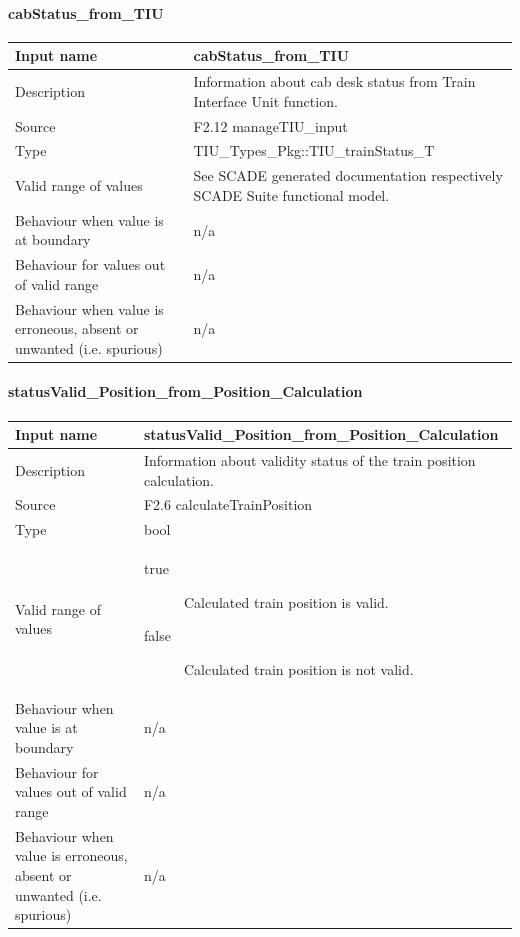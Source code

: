 \paragraph{cabStatus\_from\_TIU}

\begin{longtable}{p{}p{}}
\toprule
Input name				& cabStatus\_from\_TIU  \\
\midrule
Description				& Information about cab desk status from Train Interface Unit function. \\
\midrule
Source					& F2.12 manageTIU\_input\\ 
\midrule
Type					& TIU\_Types\_Pkg::TIU\_trainStatus\_T \\
\midrule
Valid range of values	& See SCADE generated documentation respectively SCADE Suite functional model. \\
\midrule
Behaviour when value is at boundary	& n/a \\
\midrule
Behaviour for values out of valid range	& n/a \\
\midrule
Behaviour when value is erroneous, absent or unwanted (i.e. spurious) & n/a \\
\bottomrule
\end{longtable}

\paragraph{statusValid\_Position\_from\_Position\_Calculation}

\begin{longtable}{p{}p{}}
\toprule
Input name				& statusValid\_Position\_from\_Position\_Calculation  \\
\midrule
Description				& Information about validity status of the train position calculation. \\
\midrule
Source					& F2.6 calculateTrainPosition\\ 
\midrule
Type					& bool \\
\midrule
Valid range of values	& \begin{description}
\item[true]Calculated train position is valid.
\item[false]Calculated train position is not valid.
\end{description} \\
\midrule
Behaviour when value is at boundary	& n/a \\
\midrule
Behaviour for values out of valid range	& n/a\\
\midrule
Behaviour when value is erroneous, absent or unwanted (i.e. spurious) & n/a \\
\bottomrule
\end{longtable}

